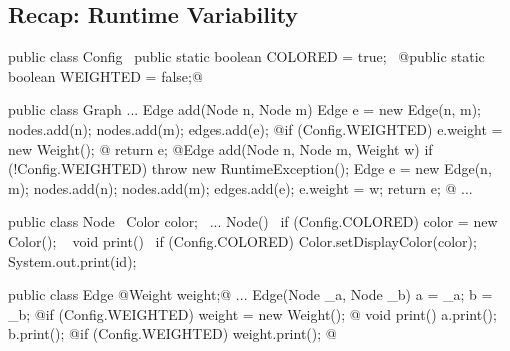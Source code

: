 
\subsection{Recap: Runtime Variability}

\begin{frame}[fragile]{\myframetitle}
	\begin{mycolumns}[animation=none]
\begin{codetight}[basicstyle=\footnotesize]{}
public class Config {
	~public static boolean COLORED = true;~
	@public static boolean WEIGHTED = false;@
}
\end{codetight}
\begin{codetight}[basicstyle=\footnotesize]{}
public class Graph {
	...
	Edge add(Node n, Node m) {
		Edge e = new Edge(n, m);
		nodes.add(n); nodes.add(m); edges.add(e);
		@if (Config.WEIGHTED) { e.weight = new Weight(); }@
		return e;
	}
	@Edge add(Node n, Node m, Weight w) {
		if (!Config.WEIGHTED) { throw new RuntimeException(); }
		Edge e = new Edge(n, m);
		nodes.add(n); nodes.add(m); edges.add(e);
		e.weight = w;
		return e;
	}@
	...
}
\end{codetight}
	\mynextcolumn
\begin{codetight}[basicstyle=\footnotesize]{}
public class Node {
	~Color color;~
	...
	Node(){
		~if (Config.COLORED) { color = new Color(); }~
	}
	void print() {
		~if (Config.COLORED) { Color.setDisplayColor(color); }~
		System.out.print(id);
	}
}
\end{codetight}
\begin{codetight}[basicstyle=\footnotesize]{}
public class Edge {
	@Weight weight;@
	...
	Edge(Node _a, Node _b) {
		a = _a; b = _b;
		@if (Config.WEIGHTED) { weight = new Weight(); }@
	}
	void print() {
		a.print(); b.print();
		@if (Config.WEIGHTED) { weight.print(); }@
	}
}
\end{codetight}
	\end{mycolumns}
\end{frame}

